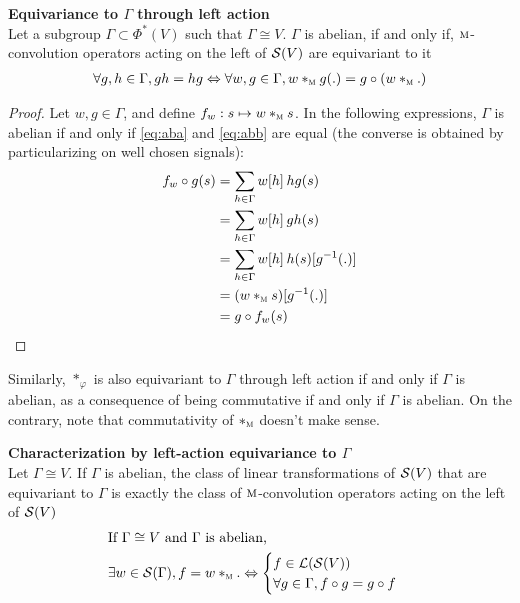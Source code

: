 \begin{proposition}\textbf{Equivariance to $\Gamma$ through left action}\\
Let a subgroup $\Gamma \subset \Phi^*(V)$ such that $\Gamma \cong V$. $\Gamma$ is abelian, if and only if, $\M$-convolution operators acting on the left of $\cs(V)$ are equivariant to it \ie
\begin{gather*}
\forall g,h \in \Gamma, gh = hg \Leftrightarrow \forall w, g \in \Gamma, w \ast_{\M} g(.) = g \circ (w \ast_{\M} .) 
\end{gather*}
\end{proposition}

\begin{proof}
Let $w, g \in \Gamma$, and define $f_w: s \mapsto w \ast_{\M} s$. In the following expressions, $\Gamma$ is abelian if and only if \eqref{eq:aba} and \eqref{eq:abb} are equal (the converse is obtained by particularizing on well chosen signals):
\begin{align}
f_w \circ g (s) & = \displaystyle \sum_{h \in \Gamma} w[h] \h{2} hg(s) \label{eq:aba}\\
 & = \displaystyle \sum_{h \in \Gamma} w[h] \h{2} gh(s) \label{eq:abb}\\
 & = \displaystyle \sum_{h \in \Gamma} w[h] \h{2} h(s)[g^{-1}(.)] \nn\\
 & = (w \ast_{\M} s )[g^{-1}(.)] \nn\\
 & = g \circ f_w (s) \nn
\end{align}
\end{proof}

\begin{remark}Similarly, $\ast_{\varphi}$ is also equivariant to $\Gamma$ through left action if and only if $\Gamma$ is abelian, as a consequence of being commutative if and only if $\Gamma$ is abelian. On the contrary, note that commutativity of $\ast_{\M}$ doesn't make sense.
\end{remark}

\begin{corrolary}\textbf{Characterization by left-action equivariance to $\Gamma$}\\
Let $\Gamma \cong V$. If $\Gamma$ is abelian, the class of linear transformations of $\cs(V)$ that are equivariant to $\Gamma$ is exactly the class of $\M$-convolution operators acting on the left of $\cs(V)$ \ie
\begin{align*}
& \text{If } \Gamma \cong V \text{ and $\Gamma$ is abelian,}\\
& \exists w \in \cs(\Gamma), f = w \ast_{\M} . \Leftrightarrow
\begin{cases}
f \in \cl(\cs(V))\\
\forall g \in \Gamma, f \circ g = g \circ f
\end{cases}
\end{align*}
\label{cor:equiM}
\end{corrolary}

